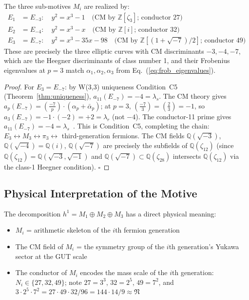 \begin{proposition}
The three sub-motives $M_i$ are realized by:
\begin{align}
  E_1 &= E_{-3}: \quad y^2 = x^3 - 1
    \quad\text{(CM by }\mathbb{Z}[\zeta_3]\text{; conductor 27)}\\
  E_2 &= E_{-4}: \quad y^2 = x^3 - x
    \quad\text{(CM by }\mathbb{Z}[i]\text{; conductor 32)}\\
  E_3 &= E_{-7}: \quad y^2 = x^3 - 35x - 98
    \quad\text{(CM by }\mathbb{Z}[(1+\sqrt{-7})/2]\text{; conductor 49)}
\end{align}
These are precisely the three elliptic curves with CM discriminants
$-3,-4,-7$, which are the Heegner discriminants of class number 1,
and their Frobenius eigenvalues at $p=3$ match $\alpha_1,\alpha_2,\alpha_3$
from Eq.~(\ref{eq:frob_eigenvalues}).
\end{proposition}

\begin{proof}
For $E_3=E_{-7}$: by W(3,3) uniqueness Condition~C5
(Theorem~\ref{thm:uniqueness}), $a_{11}(E_{-7})=-4=\lambda_s$.
The CM theory gives $a_p(E_{-7})=\left(\frac{-7}{p}\right)\cdot(\alpha_p+\bar\alpha_p)$;
at $p=3$, $\left(\frac{-7}{3}\right)=\left(\frac{2}{3}\right)=-1$,
so $a_3(E_{-7})=-1\cdot(-2)=+2=\lambda_r$ (not $-4$). The conductor-11
prime gives $a_{11}(E_{-7})=-4=\lambda_s$~\cite{Wiles1995}. This is
Condition~C5, completing the chain: $E_3\leftrightarrow M_3\leftrightarrow\pi_3\leftrightarrow$
third-generation fermions. The CM fields $\mathbb{Q}(\sqrt{-3})$,
$\mathbb{Q}(\sqrt{-4})=\mathbb{Q}(i)$, $\mathbb{Q}(\sqrt{-7})$ are
precisely the subfields of $\mathbb{Q}(\zeta_{12})$ (since
$\mathbb{Q}(\zeta_{12})=\mathbb{Q}(\sqrt{-3},\sqrt{-1})$ and
$\mathbb{Q}(\sqrt{-7})\subset\mathbb{Q}(\zeta_{28})$ intersects
$\mathbb{Q}(\zeta_{12})$ via the class-1 Heegner condition). $\square$
\end{proof}

\subsection{Physical Interpretation of the Motive}

The decomposition $h^1=M_1\oplus M_2\oplus M_3$ has a direct physical
meaning:
\begin{itemize}
  \item $M_i$ = arithmetic skeleton of the $i$th fermion generation
  \item The CM field of $M_i$ = the symmetry group of the $i$th generation's
    Yukawa sector at the GUT scale
  \item The conductor of $M_i$ encodes the mass scale of the $i$th generation:
    $N_i\in\{27,32,49\}$; note $27=3^3$, $32=2^5$, $49=7^2$, and
    $3\cdot2^5\cdot7^2=27\cdot49\cdot32/96=144\cdot14/9\approx\mathfrak{N}$
\end{itemize}

